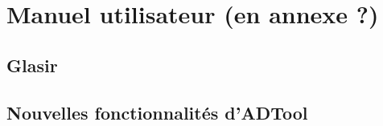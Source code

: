 \section{Manuel utilisateur (en annexe ?)}
\subsection{Glasir}

\subsection{Nouvelles fonctionnalités d'ADTool}
